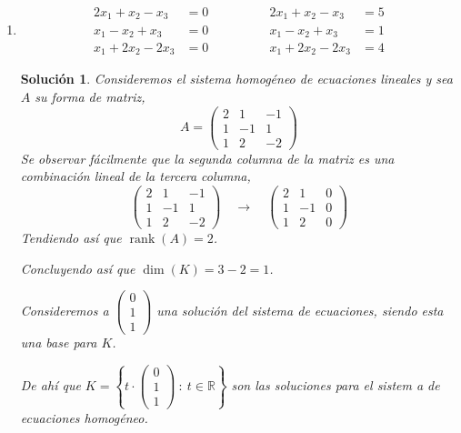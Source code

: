 \documentclass[letterpaper]{article}
\newcommand{\R}{\mathbb{R}}
\DeclareMathOperator{\rank}{rank}
\newtheorem*{sol}{Solución}
\begin{document}
\begin{enumerate}
\begin{enumerate}[label=(\alph*)]
    \item
    \begin{equation*}
        \begin{split}
            2x_1 + x_2 - x_3 &= 0\\
            x_1 - x_2 + x_3 &= 0\\
            x_1 + 2x_2 - 2x_3 &= 0
        \end{split}
        \qquad\qquad
        \begin{split}
            2x_1 + x_2 - x_3 &= 5\\
            x_1 - x_2 + x_3 &= 1\\
            x_1 + 2x_2 - 2x_3 &= 4
        \end{split}
    \end{equation*}

    \begin{sol}
    Consideremos el sistema homogéneo de ecuaciones lineales y sea $A$ su forma de matriz,
    \[
        A =
        \begin{pmatrix}
            2 & 1  & -1\\
            1 & -1 & 1\\
            1 & 2  & -2
        \end{pmatrix}
    \]
    Se observar fácilmente que la segunda columna de la matriz es una combinación lineal de la tercera columna,
    \[
        \begin{pmatrix}
            2 & 1  & -1\\
            1 & -1 & 1\\
            1 & 2  & -2
        \end{pmatrix}
        \quad\longrightarrow\quad
        \begin{pmatrix}
            2 & 1  & 0\\
            1 & -1 & 0\\
            1 & 2  & 0
        \end{pmatrix}
    \]
    Tendiendo así que $\rank(A) = 2$.

    Concluyendo así que $\dim(K) = 3 -2 = 1$.

    Consideremos a $
    \begin{pmatrix}
        0\\
        1\\
        1
    \end{pmatrix}$ una solución del sistema de ecuaciones, siendo esta una base para $K$.

    De ahí que $K = \left\{
        t \cdot
        \begin{pmatrix}
            0\\
            1\\
            1
        \end{pmatrix} \: : \: t \in \R
    \right\}$ son las soluciones para el sistem a de ecuaciones homogéneo.


\end{sol}
\end{enumerate}
\end{enumerate}
\end{document}
